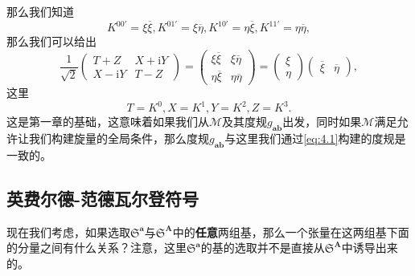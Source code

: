 那么我们知道
\begin{equation*}
	K^{00'} =\xi \overline{\xi } ,K^{01'} =\xi \overline{\eta } ,K^{10'} =\eta \overline{\xi } ,K^{11'} =\eta \overline{\eta } ,
\end{equation*}
那么我们可以给出
\begin{equation*}
	\frac{1}{\sqrt{2}}\begin{pmatrix}
		T+Z & X+\mathrm{i} Y\\
		X-\mathrm{i} Y & T-Z
	\end{pmatrix} =\begin{pmatrix}
		\xi \overline{\xi } & \xi \overline{\eta }\\
		\eta \overline{\xi } & \eta \overline{\eta }
	\end{pmatrix} =\begin{pmatrix}
		\xi \\
		\eta 
	\end{pmatrix}\begin{pmatrix}
		\overline{\xi } & \overline{\eta }
	\end{pmatrix} ,
\end{equation*}
这里
\begin{equation*}
	T=K^{0} ,X=K^{1} ,Y=K^{2} ,Z=K^{3} .
\end{equation*}
这是第一章的基础，这意味着如果我们从$\mathcal{M}$及其度规$g_{\boldsymbol{ab}}$出发，同时如果$\mathcal{M}$满足允许让我们构建旋量的全局条件，那么度规$g_{\boldsymbol{ab}}$与这里我们通过\ref{eq:4.1}构建的度规是一致的。


\subsection{英费尔德-范德瓦尔登符号}

现在我们考虑，如果选取$\mathfrak{S}^{\boldsymbol{a}}$与$\mathfrak{S}^{\boldsymbol{A}}$中的\textbf{任意}两组基，那么一个张量在这两组基下面的分量之间有什么关系？注意，这里$\mathfrak{S}^{\boldsymbol{a}}$的基的选取并不是直接从$\mathfrak{S}^{\boldsymbol{A}}$中诱导出来的。



